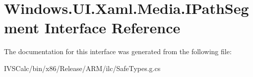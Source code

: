 \hypertarget{interface_windows_1_1_u_i_1_1_xaml_1_1_media_1_1_i_path_segment}{}\section{Windows.\+U\+I.\+Xaml.\+Media.\+I\+Path\+Segment Interface Reference}
\label{interface_windows_1_1_u_i_1_1_xaml_1_1_media_1_1_i_path_segment}


The documentation for this interface was generated from the following file\+:\begin{DoxyCompactItemize}
\item 
I\+V\+S\+Calc/bin/x86/\+Release/\+A\+R\+M/ilc/Safe\+Types.\+g.\+cs\end{DoxyCompactItemize}
